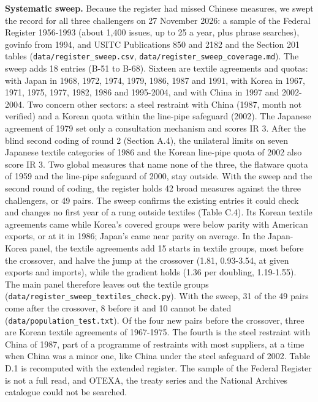 \textbf{Systematic sweep.} Because the register had missed Chinese
measures, we swept the record for all three challengers on 27 November
2026: a sample of the Federal Register 1956-1993 (about 1,400 issues, up
to 25 a year, plus phrase searches), govinfo from 1994, and USITC
Publications 850 and 2182 and the Section 201 tables
(\texttt{data/\allowbreak{}register\_\allowbreak{}sweep.csv},
\texttt{data/\allowbreak{}register\_\allowbreak{}sweep\_\allowbreak{}coverage.md}). The sweep adds 18 entries
(B-51 to B-68). Sixteen are textile agreements and quotas: with Japan in
1968, 1972, 1974, 1979, 1986, 1987 and 1991, with Korea in 1967, 1971,
1975, 1977, 1982, 1986 and 1995-2004, and with China in 1997 and
2002-2004. Two concern other sectors: a steel restraint with China
(1987, month not verified) and a Korean quota within the line-pipe
safeguard (2002). The Japanese agreement of 1979 set only a consultation
mechanism and scores IR 3. After the blind second coding of round 2
(Section A.4), the unilateral limits on seven Japanese textile
categories of 1986 and the Korean line-pipe quota of 2002 also score IR
3. Two global measures that name none of the three, the flatware quota
of 1959 and the line-pipe safeguard of 2000, stay outside. With the
sweep and the second round of coding, the register holds 42 broad
measures against the three challengers, or 49 pairs. The sweep confirms
the existing entries it could check and changes no first year of a rung
outside textiles (Table C.4). Its Korean textile agreements came while
Korea's covered groups were below parity with American exports, or at it
in 1986; Japan's came near parity on average. In the Japan-Korea panel,
the textile agreements add 15 starts in textile groups, most before the
crossover, and halve the jump at the crossover (1.81, 0.93-3.54, at
given exports and imports), while the gradient holds (1.36 per doubling,
1.19-1.55). The main panel therefore leaves out the textile groups
(\texttt{data/\allowbreak{}register\_\allowbreak{}sweep\_\allowbreak{}textiles\_\allowbreak{}check.py}). With the sweep, 31
of the 49 pairs come after the crossover, 8 before it and 10 cannot be
dated (\texttt{data/\allowbreak{}population\_\allowbreak{}test.txt}). Of the four new pairs before
the crossover, three are Korean textile agreements of 1967-1975. The
fourth is the steel restraint with China of 1987, part of a programme of
restraints with most suppliers, at a time when China was a minor one,
like China under the steel safeguard of 2002. Table D.1 is recomputed
with the extended register. The sample of the Federal Register is not a
full read, and OTEXA, the treaty series and the National Archives
catalogue could not be searched.

